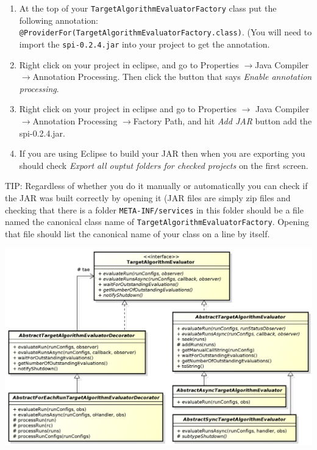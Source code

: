 \documentclass[11pt,letterpaper,oneside]{article}
\begin{document}
\begin{enumerate} 
\item At the top of your \texttt{TargetAlgorithmEvaluatorFactory} class put the following annotation: \texttt{@ProviderFor(TargetAlgorithmEvaluatorFactory.class)}. (You will need to import the  \texttt{spi-0.2.4.jar} into your project to get the annotation.

\item Right click on your project in eclipse, and go to Properties $\rightarrow$Java Compiler$\rightarrow$Annotation Processing. Then click the button that says \emph{Enable annotation processing}.

\item Right click on your project in eclipse and go to Properties $\rightarrow$ Java Compiler $\rightarrow$Annotation Processing $\rightarrow$Factory Path, and hit \emph{Add JAR} button add the spi-0.2.4.jar.

\item If you are using Eclipse to build your JAR then when you are exporting you should check \emph{Export all ouptut folders for checked projects} on the first screen. 


\end{enumerate}

\textsc{TIP:} Regardless of whether you do it manually or automatically you can check if the JAR was built correctly by opening it (JAR files are simply zip files and checking that there is a folder \texttt{META-INF/services} in this folder should be a file named the canonical class name of \texttt{TargetAlgorithmEvaluatorFactory}. Opening that file should list the canonical name of your class on a line by itself.

\begin{center}
\includegraphics[scale=0.65]{img/UML/TAESubtypes.png}
\end{center}
\end{document}
